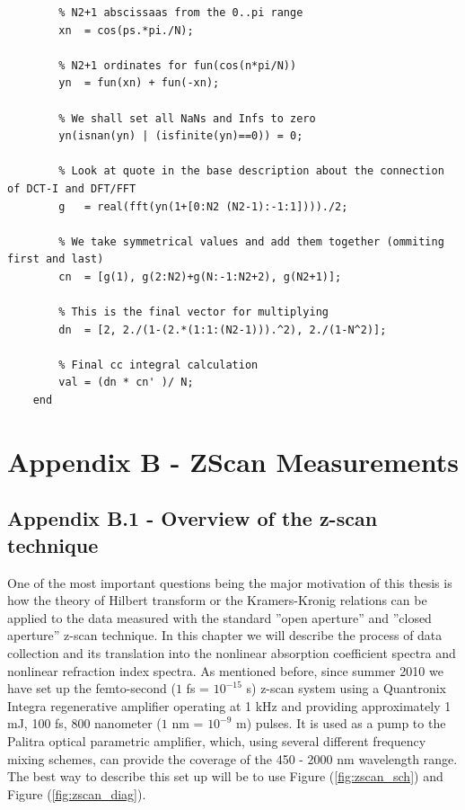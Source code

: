 \documentclass[12pt,twoside,a4paper]{article}
\numberwithin{equation}{subsection}
\numberwithin{figure}{subsection}
\begin{document}
\begin{lstlisting}
	    % N2+1 abscissaas from the 0..pi range
	    xn  = cos(ps.*pi./N);                                
	    
	    % N2+1 ordinates for fun(cos(n*pi/N))
	    yn  = fun(xn) + fun(-xn);                            
	    
	    % We shall set all NaNs and Infs to zero
	    yn(isnan(yn) | (isfinite(yn)==0)) = 0;               
	    
	    % Look at quote in the base description about the connection of DCT-I and DFT/FFT
	    g   = real(fft(yn(1+[0:N2 (N2-1):-1:1])))./2;        
	    
	    % We take symmetrical values and add them together (ommiting first and last)
	    cn  = [g(1), g(2:N2)+g(N:-1:N2+2), g(N2+1)];         
	    
	    % This is the final vector for multiplying
	    dn  = [2, 2./(1-(2.*(1:1:(N2-1))).^2), 2./(1-N^2)];  
	    
	    % Final cc integral calculation
	    val = (dn * cn' )/ N;                                
	end
\end{lstlisting}

\section*{Appendix B - ZScan Measurements} \label{chap:zscan}
\subsection*{Appendix B.1 - Overview of the z-scan technique} \label{chap:zscan_overview}

One of the most important questions being the major motivation of this thesis is how the theory of Hilbert transform or the Kramers-Kronig relations can be applied to the data measured with the standard ''open aperture'' and ''closed aperture'' z-scan technique. In this chapter we will describe the process of data collection and its translation into the nonlinear absorption coefficient spectra and nonlinear refraction index spectra. As mentioned before, since summer 2010 we have set up the femto-second ($1$ fs = $10^{-15}$ s) z-scan system using a Quantronix Integra regenerative amplifier operating at 1 kHz and providing approximately 1 mJ, 100 fs, 800 nanometer ($1$ nm = $10^{-9}$ m) pulses. It is used as a pump to the Palitra optical parametric amplifier, which, using several different frequency mixing schemes, can provide the coverage of the 450 - 2000 nm wavelength range. The best way to describe this set up will be to use Figure (\ref{fig:zscan_sch}) and Figure (\ref{fig:zscan_diag}).
\end{document}
